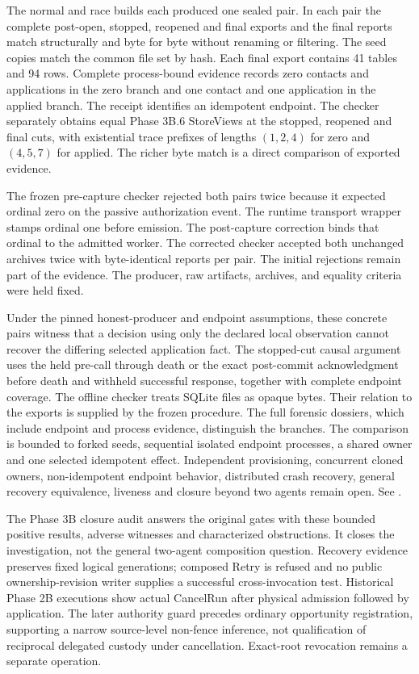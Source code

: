 \documentclass[11pt,a4paper]{article}
\theoremstyle{definition}
\theoremstyle{remark}
\begin{document}
The normal and race builds each produced one sealed pair. In each pair the complete post-open, stopped, reopened and final  exports and the final  reports match structurally and byte for byte without renaming or filtering. The seed copies match the common file set by hash. Each final export contains 41 tables and 94 rows. Complete process-bound evidence records zero contacts and applications in the zero branch and one contact and one application in the applied branch. The receipt identifies an idempotent endpoint. The checker separately obtains equal Phase 3B.6 StoreViews at the stopped, reopened and final cuts, with existential trace prefixes of lengths $(1,2,4)$ for zero and $(4,5,7)$ for applied. The richer byte match is a direct comparison of exported evidence.

The frozen pre-capture checker rejected both pairs twice because it expected ordinal zero on the passive authorization event. The runtime transport wrapper stamps ordinal one before emission. The post-capture correction binds that ordinal to the admitted worker. The corrected checker accepted both unchanged archives twice with byte-identical reports per pair. The initial rejections remain part of the evidence. The producer, raw artifacts, archives, and equality criteria were held fixed.

Under the pinned honest-producer and endpoint assumptions, these concrete pairs witness that a decision using only the declared local observation cannot recover the differing selected application fact. The stopped-cut causal argument uses the held pre-call through death or the exact post-commit acknowledgment before death and withheld successful response, together with complete endpoint coverage. The offline checker treats SQLite files as opaque bytes. Their relation to the exports is supplied by the frozen procedure. The full forensic dossiers, which include endpoint and process evidence, distinguish the branches. The comparison is bounded to forked seeds, sequential isolated endpoint processes, a shared owner and one selected idempotent effect. Independent provisioning, concurrent cloned owners, non-idempotent endpoint behavior, distributed crash recovery, general recovery equivalence, liveness and closure beyond two agents remain open. See .

The Phase 3B closure audit answers the original gates with these bounded positive results, adverse witnesses and characterized obstructions. It closes the investigation, not the general two-agent composition question. Recovery evidence preserves fixed logical generations; composed Retry is refused and no public ownership-revision writer supplies a successful cross-invocation test. Historical Phase 2B executions show actual CancelRun after physical admission followed by application. The later authority guard precedes ordinary opportunity registration, supporting a narrow source-level non-fence inference, not qualification of reciprocal delegated custody under cancellation. Exact-root revocation remains a separate operation.
\end{document}
